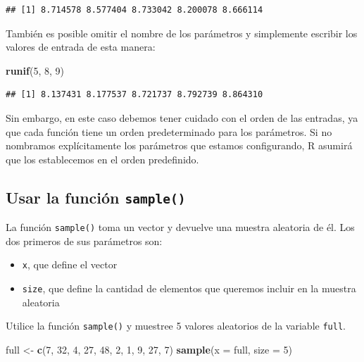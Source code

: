 \documentclass[
]{book}
\newenvironment{Shaded}{\begin{snugshade}}{\end{snugshade}}
\newcommand{\DataTypeTok}[1]{\textcolor[rgb]{0.13,0.29,0.53}{#1}}
\newcommand{\DecValTok}[1]{\textcolor[rgb]{0.00,0.00,0.81}{#1}}
\newcommand{\KeywordTok}[1]{\textcolor[rgb]{0.13,0.29,0.53}{\textbf{#1}}}
\newcommand{\NormalTok}[1]{#1}
\newcommand{\StringTok}[1]{\textcolor[rgb]{0.31,0.60,0.02}{#1}}
\providecommand{\tightlist}{%
  \setlength{\itemsep}{0pt}\setlength{\parskip}{0pt}}
\begin{document}
\begin{verbatim}
## [1] 8.714578 8.577404 8.733042 8.200078 8.666114
\end{verbatim}

También es posible omitir el nombre de los parámetros y simplemente escribir los valores de entrada de esta manera:

\begin{Shaded}
\begin{Highlighting}[]
\KeywordTok{runif}\NormalTok{(}\DecValTok{5}\NormalTok{, }\DecValTok{8}\NormalTok{, }\DecValTok{9}\NormalTok{)}
\end{Highlighting}
\end{Shaded}

\begin{verbatim}
## [1] 8.137431 8.177537 8.721737 8.792739 8.864310
\end{verbatim}

Sin embargo, en este caso debemos tener cuidado con el orden de las entradas, ya que cada función tiene un orden predeterminado para los parámetros. Si no nombramos explícitamente los parámetros que estamos configurando, R asumirá que los establecemos en el orden predefinido.

\hypertarget{usar-la-funciuxf3n-sample}{%
\subsection{\texorpdfstring{Usar la función \texttt{sample()}}{Usar la función sample()}}\label{usar-la-funciuxf3n-sample}}

La función \texttt{sample()} toma un vector y devuelve una muestra aleatoria de él. Los dos primeros de sus parámetros son:

\begin{itemize}
\tightlist
\item
  \texttt{x}, que define el vector
\item
  \texttt{size}, que define la cantidad de elementos que queremos incluir en la muestra aleatoria
\end{itemize}

Utilice la función \texttt{sample()} y muestree 5 valores aleatorios de la variable \texttt{full}.

\begin{Shaded}
\begin{Highlighting}[]
\NormalTok{full <-}\StringTok{ }\KeywordTok{c}\NormalTok{(}\DecValTok{7}\NormalTok{, }\DecValTok{32}\NormalTok{, }\DecValTok{4}\NormalTok{, }\DecValTok{27}\NormalTok{, }\DecValTok{48}\NormalTok{, }\DecValTok{2}\NormalTok{, }\DecValTok{1}\NormalTok{, }\DecValTok{9}\NormalTok{, }\DecValTok{27}\NormalTok{, }\DecValTok{7}\NormalTok{)}
\KeywordTok{sample}\NormalTok{(}\DataTypeTok{x =}\NormalTok{ full, }\DataTypeTok{size =} \DecValTok{5}\NormalTok{)}
\end{Highlighting}
\end{Shaded}
\end{document}
